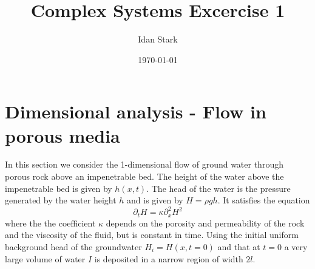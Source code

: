 \documentclass{article}
\title{Complex Systems Excercise 1}
\author{Idan Stark}
\date{\today}
\begin{document}
\maketitle

\section{ Dimensional analysis - Flow in porous media}

In this section we consider the 1-dimensional flow of ground water through porous rock above an impenetrable bed. The height of the water above the impenetrable bed is given by $h(x, t)$. The head of the water is the pressure generated by the water height $h$ and is given by $H = \rho gh$. It satisfies the equation
\begin{equation}
    \partial_t H = \kappa \partial_x^2 H^2
\end{equation}
where the the coefficient $\kappa$ depends on the porosity and permeability of the rock and the viscosity of the fluid, but is constant in time. Using the initial uniform background head of the groundwater $H_i = H(x, t = 0)$ and that at $t = 0$ a very large volume of water $I$ is deposited in a narrow region of width $2l$.
\end{document}
